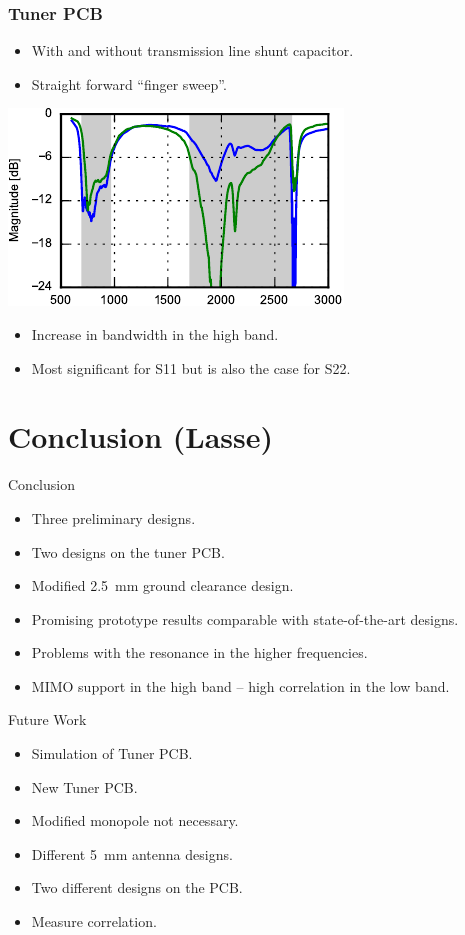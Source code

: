 \begin{frame}
  \frametitle{Tuner PCB}
  \begin{itemize}
  \item With and without transmission line shunt capacitor.
  \item Straight forward ``finger sweep''.
  \end{itemize}
\begin{center}
    \includegraphics[scale=1.4]{img/Lasse/tuner_pcb/003_s11top.pdf}
\end{center}
\begin{itemize}
\item Increase in bandwidth in the high band.
\item Most significant for S11 but is also the case for S22. 
\end{itemize}
\legendfooter
\end{frame}

\section[Conclusion]{Conclusion (Lasse)}
\begin{frame}
  \begin{block}{Conclusion}
    \begin{itemize}
    \item Three preliminary designs.
    \item Two designs on the tuner PCB.
    \item Modified \SI{2.5}{mm} ground clearance design.
    \item Promising prototype results comparable with state-of-the-art designs.
    \item Problems with the resonance in the higher frequencies.
    \item MIMO support in the high band -- high correlation in the low band.
    \end{itemize}
  \end{block}
  \begin{block}{Future Work}
    \begin{itemize}
    \item Simulation of Tuner PCB.
    \item New Tuner PCB.
    \item Modified monopole not necessary. 
    \item Different \SI{5}{mm} antenna designs.
    \item Two different designs on the PCB.
    \item Measure correlation.
    \end{itemize}
  \end{block}
\end{frame}

